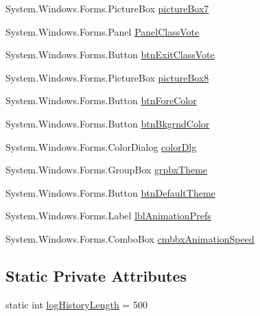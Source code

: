 \begin{DoxyCompactItemize}
\item 
\-System.\-Windows.\-Forms.\-Picture\-Box \hyperlink{class_sr_p___classroom_inq_1_1frm_classrrom_inq_a48b90a7203524b9da0e6bcba8ea1ba6e}{picture\-Box7}
\item 
\-System.\-Windows.\-Forms.\-Panel \hyperlink{class_sr_p___classroom_inq_1_1frm_classrrom_inq_a1225290cf0284e727d8a2ce9aa2d2a33}{\-Panel\-Class\-Vote}
\item 
\-System.\-Windows.\-Forms.\-Button \hyperlink{class_sr_p___classroom_inq_1_1frm_classrrom_inq_a86eaeeecc049840138ceb3aa2d9bf9ef}{btn\-Exit\-Class\-Vote}
\item 
\-System.\-Windows.\-Forms.\-Picture\-Box \hyperlink{class_sr_p___classroom_inq_1_1frm_classrrom_inq_a22ca58dbc8343b3531e756221803eb3d}{picture\-Box8}
\item 
\-System.\-Windows.\-Forms.\-Button \hyperlink{class_sr_p___classroom_inq_1_1frm_classrrom_inq_af3a459dee89d074c46f08528279e61e0}{btn\-Fore\-Color}
\item 
\-System.\-Windows.\-Forms.\-Button \hyperlink{class_sr_p___classroom_inq_1_1frm_classrrom_inq_a658aa508b7219ac91df61ae4e5b61e90}{btn\-Bkgrnd\-Color}
\item 
\-System.\-Windows.\-Forms.\-Color\-Dialog \hyperlink{class_sr_p___classroom_inq_1_1frm_classrrom_inq_afb408ee0fe102fbf3df36e551ec24d4c}{color\-Dlg}
\item 
\-System.\-Windows.\-Forms.\-Group\-Box \hyperlink{class_sr_p___classroom_inq_1_1frm_classrrom_inq_a8973e652358c775fec622ec378a52bf9}{grpbx\-Theme}
\item 
\-System.\-Windows.\-Forms.\-Button \hyperlink{class_sr_p___classroom_inq_1_1frm_classrrom_inq_a17fc9570ddfb13b5334d6f36eb6e7800}{btn\-Default\-Theme}
\item 
\-System.\-Windows.\-Forms.\-Label \hyperlink{class_sr_p___classroom_inq_1_1frm_classrrom_inq_a3e47dc47a77617c03e8c0347cdc0579b}{lbl\-Animation\-Prefs}
\item 
\-System.\-Windows.\-Forms.\-Combo\-Box \hyperlink{class_sr_p___classroom_inq_1_1frm_classrrom_inq_a23b040624768af2dd1a9417f5ba031d3}{cmbbx\-Animation\-Speed}
\end{DoxyCompactItemize}
\subsection*{\-Static \-Private \-Attributes}
\begin{DoxyCompactItemize}
\item 
static int \hyperlink{class_sr_p___classroom_inq_1_1frm_classrrom_inq_a0b55eb955abb243808249457ac92ca93}{log\-History\-Length} = 500
\end{DoxyCompactItemize}


